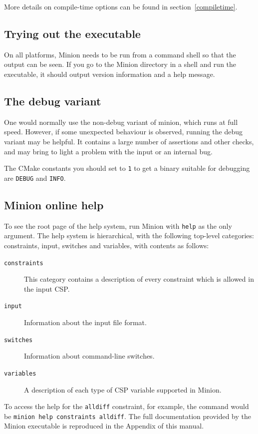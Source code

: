 \documentclass[oneside]{book}
\begin{document}
More details on compile-time options can be found in section~\ref{compiletime}.

\subsection{Trying out the executable}

On all platforms, Minion needs to be run from a command shell so that
the output can be seen. If you go to the Minion directory in a shell
and run the executable, it should output version information and a
help message. 


\subsection{The debug variant}

One would normally use the non-debug variant of minion, which runs
at full speed. However, if some unexpected behaviour is observed,
running the debug variant may be helpful. It contains a large number
of assertions and other checks, and may bring to light a problem with
the input or an internal bug.

The CMake constants you should set to \verb+1+ to get a binary suitable for
debugging are \verb+DEBUG+ and \verb+INFO+.


\subsection{Minion online help}

To see the root page of the help system, run Minion with \texttt{help}
as the only argument. The help system is hierarchical, with the following
top-level categories: constraints, input, switches and variables,
with contents as follows:

\begin{description}
\item [{\texttt{constraints}}] This category contains a description of
every constraint which is allowed in the input CSP.
\item [{\texttt{input}}] Information about the input file format.
\item [{\texttt{switches}}] Information about command-line switches.
\item [{\texttt{variables}}] A description of each type of CSP variable
supported in Minion.
\end{description}
To access the help for the \texttt{alldiff} constraint, for example, the command
would be \texttt{minion help constraints alldiff}. The full documentation
provided by the Minion executable is reproduced in the Appendix of 
this manual.
\end{document}
